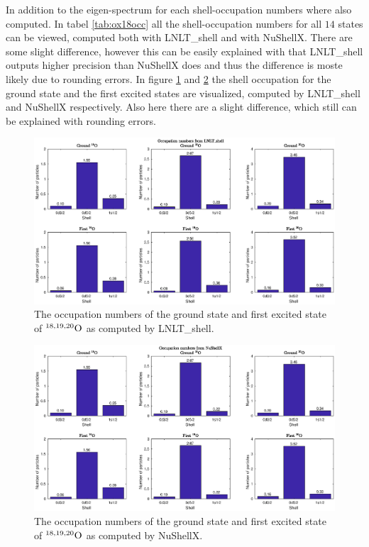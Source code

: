 In addition to the eigen-spectrum for each shell-occupation numbers where also computed. In tabel \ref{tab:ox18occ} all the shell-occupation numbers for all \(14\) states can be viewed, computed both with LNLT\_shell and with NuShellX. There are some slight difference, however this can be easily explained with that LNLT\_shell outputs higher precision than NuShellX does and thus the difference is moste likely due to rounding errors. In figure \ref{fig:occnum_lnlt} and \ref{fig:occnum_nushellx} the shell occupation for the ground state and the first excited states are visualized, computed by LNLT\_shell and NuShellX respectively. Also here there are a slight difference, which still can be explained with rounding errors. 

\begin{figure}
  \begin{center}
  \includegraphics[scale=0.5]{occupation_numbers_lnlt.eps}
  \caption{The occupation numbers of the ground state and first excited state of \(^{18,19,20}\rm{O}\) as computed by LNLT\_shell.}
  \label{fig:occnum_lnlt}
  \end{center}
\end{figure}

\begin{figure}
  \begin{center}
  \includegraphics[scale=0.5]{occupation_numbers_nushellx.eps}
  \caption{The occupation numbers of the ground state and first excited state of \(^{18,19,20}\rm{O}\) as computed by NuShellX.}
  \label{fig:occnum_nushellx}
  \end{center}
\end{figure}


